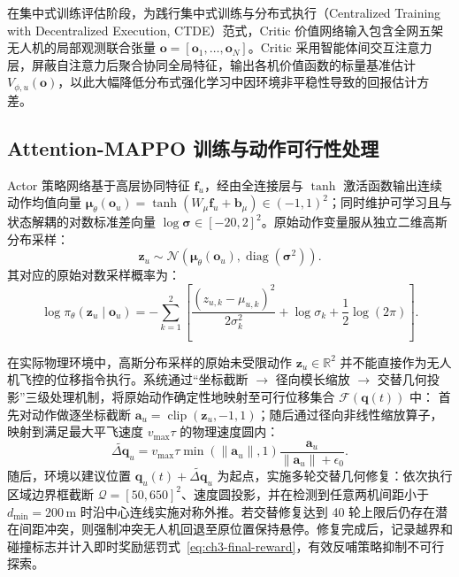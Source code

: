 在集中式训练评估阶段，为践行集中式训练与分布式执行（Centralized Training with Decentralized Execution, CTDE）范式，Critic 价值网络输入包含全网五架无人机的局部观测联合张量 $\mathbf o = [\mathbf o_1, \dots, \mathbf o_N]$。Critic 采用智能体间交互注意力层，屏蔽自注意力后聚合协同全局特征，输出各机价值函数的标量基准估计 $V_{\phi,u}(\mathbf o)$，以此大幅降低分布式强化学习中因环境非平稳性导致的回报估计方差。

\subsection{Attention-MAPPO 训练与动作可行性处理}
\label{sec:ppo-training}
\label{sec:ch3-motion-repair}

Actor 策略网络基于高层协同特征 $\mathbf f_u$，经由全连接层与 $\tanh$ 激活函数输出连续动作均值向量 $\boldsymbol\mu_\theta(\mathbf o_u) = \tanh(W_\mu \mathbf f_u + \mathbf b_\mu) \in (-1, 1)^2$；同时维护可学习且与状态解耦的对数标准差向量 $\log\boldsymbol\sigma \in [-20, 2]^2$。原始动作变量服从独立二维高斯分布采样：
\begin{equation}
    \mathbf z_u \sim \mathcal N\left(\boldsymbol\mu_\theta(\mathbf o_u), \operatorname{diag}(\boldsymbol\sigma^2)\right).
    \label{eq:ch3-normal-policy}
\end{equation}
其对应的原始对数采样概率为：
\begin{equation}
    \log\pi_\theta(\mathbf z_u \mid \mathbf o_u) = -\sum_{k=1}^2 \left[\frac{(z_{u,k} - \mu_{u,k})^2}{2\sigma_k^2} + \log\sigma_k + \frac{1}{2}\log(2\pi)\right].
    \label{eq:log-prob}
\end{equation}

在实际物理环境中，高斯分布采样的原始未受限动作 $\mathbf z_u \in \mathbb R^2$ 并不能直接作为无人机飞控的位移指令执行。系统通过“坐标截断 $\to$ 径向模长缩放 $\to$ 交替几何投影”三级处理机制，将原始动作确定性地映射至可行位移集合 $\mathcal F(\mathbf q(t))$ 中：
首先对动作做逐坐标截断 $\mathbf a_u = \operatorname{clip}(\mathbf z_u, -1, 1)$；随后通过径向非线性缩放算子，映射到满足最大平飞速度 $v_{\max}\tau$ 的物理速度圆内：
\begin{equation}
    \widetilde{\Delta\mathbf q}_u = v_{\max}\tau \min(\|\mathbf a_u\|, 1) \frac{\mathbf a_u}{\|\mathbf a_u\| + \epsilon_0}.
    \label{eq:ch3-radial-action}
\end{equation}
随后，环境以建议位置 $\mathbf q_u(t) + \widetilde{\Delta\mathbf q}_u$ 为起点，实施多轮交替几何修复：依次执行区域边界框截断 $\mathcal Q=[50, 650]^2$、速度圆投影，并在检测到任意两机间距小于 $d_{\min}=200\,\mathrm{m}$ 时沿中心连线实施对称外推。若交替修复达到 40 轮上限后仍存在潜在间距冲突，则强制冲突无人机回退至原位置保持悬停。修复完成后，记录越界和碰撞标志并计入即时奖励惩罚式~\eqref{eq:ch3-final-reward}，有效反哺策略抑制不可行探索。

